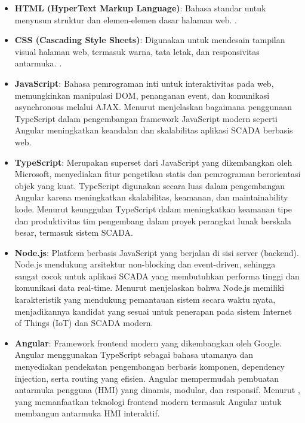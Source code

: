 \begin{itemize}
    \item \textbf{HTML (HyperText Markup Language)}: Bahasa standar untuk menyusun struktur dan elemen-elemen dasar halaman web. \textcite{bhanarkar2023responsive}.

    \item \textbf{CSS (Cascading Style Sheets)}: Digunakan untuk mendesain tampilan visual halaman web, termasuk warna, tata letak, dan responsivitas antarmuka. \textcite{singh2014responsive}.

    \item \textbf{JavaScript}: Bahasa pemrograman inti untuk interaktivitas pada web, memungkinkan manipulasi DOM, penanganan event, dan komunikasi asynchronous melalui AJAX. Menurut \textcite{emmanni2025typescript} menjelaskan bagaimana penggunaan TypeScript dalam pengembangan framework JavaScript modern seperti Angular meningkatkan keandalan dan skalabilitas aplikasi SCADA berbasis web.

    \item \textbf{TypeScript}: Merupakan superset dari JavaScript yang dikembangkan oleh Microsoft, menyediakan fitur pengetikan statis dan pemrograman berorientasi objek yang kuat. TypeScript digunakan secara luas dalam pengembangan Angular karena meningkatkan skalabilitas, keamanan, dan maintainability kode. Menurut \textcite{scarsbrook2023typescript} keunggulan TypeScript dalam meningkatkan keamanan tipe dan produktivitas tim pengembang dalam proyek perangkat lunak berskala besar, termasuk sistem SCADA.

    \item \textbf{Node.js}: Platform berbasis JavaScript yang berjalan di sisi server (backend). Node.js mendukung arsitektur non-blocking dan event-driven, sehingga sangat cocok untuk aplikasi SCADA yang membutuhkan performa tinggi dan komunikasi data real-time. Menurut \textcite{ancona2018nodejs} menjelaskan bahwa Node.js memiliki karakteristik yang mendukung pemantauan sistem secara waktu nyata, menjadikannya kandidat yang sesuai untuk penerapan pada sistem Internet of Things (IoT) dan SCADA modern.

    \item \textbf{Angular}: Framework frontend modern yang dikembangkan oleh Google. Angular menggunakan TypeScript sebagai bahasa utamanya dan menyediakan pendekatan pengembangan berbasis komponen, dependency injection, serta routing yang efisien. Angular mempermudah pembuatan antarmuka pengguna (HMI) yang dinamis, modular, dan responsif. Menurut \textcite{jointjs2023scada}, yang memanfaatkan teknologi frontend modern termasuk Angular untuk membangun antarmuka HMI interaktif.

\end{itemize}

